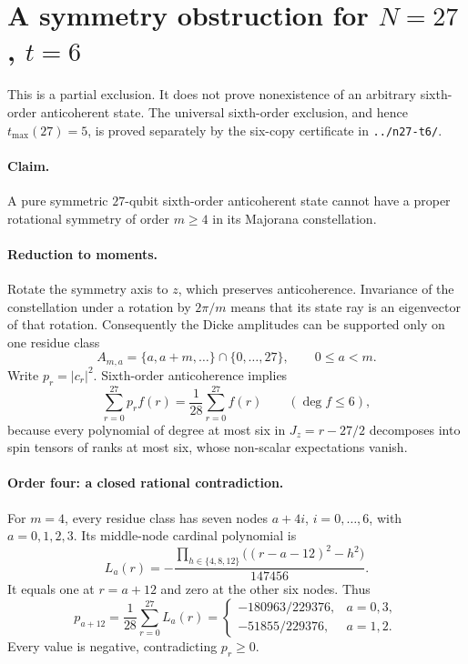 \documentclass{article}
\begin{document}
\section*{A symmetry obstruction for $N=27$, $t=6$}
This is a partial exclusion. It does not prove nonexistence of an arbitrary
sixth-order anticoherent state. The universal sixth-order exclusion, and hence
$t_{\max}(27)=5$, is proved separately by the six-copy certificate in
\texttt{../n27-t6/}.

\paragraph{Claim.}
A pure symmetric $27$-qubit sixth-order anticoherent state cannot have a
proper rotational symmetry of order $m\ge4$ in its Majorana constellation.

\paragraph{Reduction to moments.}
Rotate the symmetry axis to $z$, which preserves anticoherence. Invariance
of the constellation under a rotation by $2\pi/m$ means that its state ray
is an eigenvector of that rotation. Consequently the Dicke amplitudes
can be supported only on one residue class
\[
 A_{m,a}=\{a,a+m,\ldots\}\cap\{0,\ldots,27\},\qquad0\le a<m.
\]
Write $p_r=|c_r|^2$. Sixth-order anticoherence implies
\[
 \sum_{r=0}^{27}p_r f(r)=\frac1{28}\sum_{r=0}^{27}f(r)
 \qquad(\deg f\le6),
\]
because every polynomial of degree at most six in
$J_z=r-27/2$ decomposes into spin tensors of ranks at most six, whose
non-scalar expectations vanish.

\paragraph{Order four: a closed rational contradiction.}
For $m=4$, every residue class has seven nodes $a+4i$, $i=0,\ldots,6$,
with $a=0,1,2,3$. Its middle-node cardinal polynomial is
\[
 L_a(r)=-\frac{\displaystyle\prod_{h\in\{4,8,12\}}
                   \bigl((r-a-12)^2-h^2\bigr)}{147456}.
\]
It equals one at $r=a+12$ and zero at the other six nodes. Thus
\[
 p_{a+12}=\frac1{28}\sum_{r=0}^{27}L_a(r)=
 \begin{cases}
  -180963/229376,&a=0,3,\\
  -51855/229376,&a=1,2.
 \end{cases}
\]
Every value is negative, contradicting $p_r\ge0$.
\end{document}
